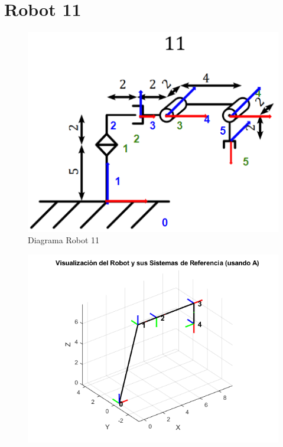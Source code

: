 \section{Robot 11}
\begin{figure}[h]
	\centering
	\includegraphics[width=0.7\linewidth]{../Prueba_DH/img/Diagrama11}
	\caption{Diagrama Robot 11}
	\label{fig:diagrama11}
\end{figure}
\begin{figure}
	\centering
	\includegraphics[width=0.7\linewidth]{../Prueba_DH/img/MatLab11}
	\caption{}
	\label{fig:matlab11}
\end{figure}